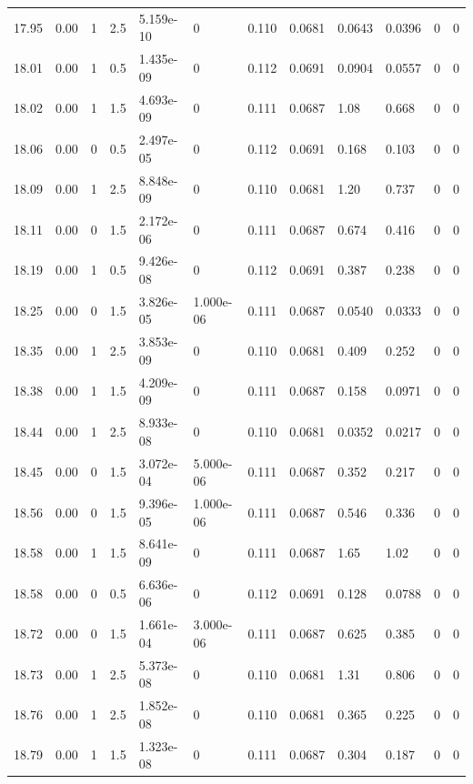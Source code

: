 \documentclass[preview]{standalone}
\begin{document}
{{{{{{{{{{\begin{tabular}{L{1.2cm}C{1.2cm} C{0.3cm}C{0.5cm} C{1.4cm}C{1.4cm} C{1.4cm}C{1.4cm} C{1.6cm}C{1.6cm} C{1.6cm}C{1.6cm}}
  17.95  &  0.00  & 1     & 2.5 &  5.159e-10  & 0  &  0.110&   0.0681& 0.0643 & 0.0396   &  0 & 0  \\ 
  18.01  &  0.00  & 1     & 0.5 &  1.435e-09  & 0  &  0.112&   0.0691& 0.0904 & 0.0557   &  0 & 0  \\ 
  18.02  &  0.00  & 1     & 1.5 &  4.693e-09  & 0  &  0.111&   0.0687& 1.08 & 0.668   &  0 & 0  \\ 
  18.06  &  0.00  & 0     & 0.5 &  2.497e-05  & 0  &  0.112&   0.0691& 0.168 & 0.103   &  0 & 0  \\ 
  18.09  &  0.00  & 1     & 2.5 &  8.848e-09  & 0  &  0.110&   0.0681& 1.20 & 0.737   &  0 & 0  \\ 
  18.11  &  0.00  & 0     & 1.5 &  2.172e-06  & 0  &  0.111&   0.0687& 0.674 & 0.416   &  0 & 0  \\ 
  18.19  &  0.00  & 1     & 0.5 &  9.426e-08  & 0  &  0.112&   0.0691& 0.387 & 0.238   &  0 & 0  \\ 
  18.25  &  0.00  & 0     & 1.5 &  3.826e-05  & 1.000e-06  &  0.111&   0.0687& 0.0540 & 0.0333   &  0 & 0  \\ 
  18.35  &  0.00  & 1     & 2.5 &  3.853e-09  & 0  &  0.110&   0.0681& 0.409 & 0.252   &  0 & 0  \\ 
  18.38  &  0.00  & 1     & 1.5 &  4.209e-09  & 0  &  0.111&   0.0687& 0.158 & 0.0971   &  0 & 0  \\ 
  18.44  &  0.00  & 1     & 2.5 &  8.933e-08  & 0  &  0.110&   0.0681& 0.0352 & 0.0217   &  0 & 0  \\ 
  18.45  &  0.00  & 0     & 1.5 &  3.072e-04  & 5.000e-06  &  0.111&   0.0687& 0.352 & 0.217   &  0 & 0  \\ 
  18.56  &  0.00  & 0     & 1.5 &  9.396e-05  & 1.000e-06  &  0.111&   0.0687& 0.546 & 0.336   &  0 & 0  \\ 
  18.58  &  0.00  & 1     & 1.5 &  8.641e-09  & 0  &  0.111&   0.0687& 1.65 & 1.02   &  0 & 0  \\ 
  18.58  &  0.00  & 0     & 0.5 &  6.636e-06  & 0  &  0.112&   0.0691& 0.128 & 0.0788   &  0 & 0  \\ 
  18.72  &  0.00  & 0     & 1.5 &  1.661e-04  & 3.000e-06  &  0.111&   0.0687& 0.625 & 0.385   &  0 & 0  \\ 
  18.73  &  0.00  & 1     & 2.5 &  5.373e-08  & 0  &  0.110&   0.0681& 1.31 & 0.806   &  0 & 0  \\ 
  18.76  &  0.00  & 1     & 2.5 &  1.852e-08  & 0  &  0.110&   0.0681& 0.365 & 0.225   &  0 & 0  \\ 
  18.79  &  0.00  & 1     & 1.5 &  1.323e-08  & 0  &  0.111&   0.0687& 0.304 & 0.187   &  0 & 0  \\ 

\end{tabular}}}}}}}}}}}
\end{document}

